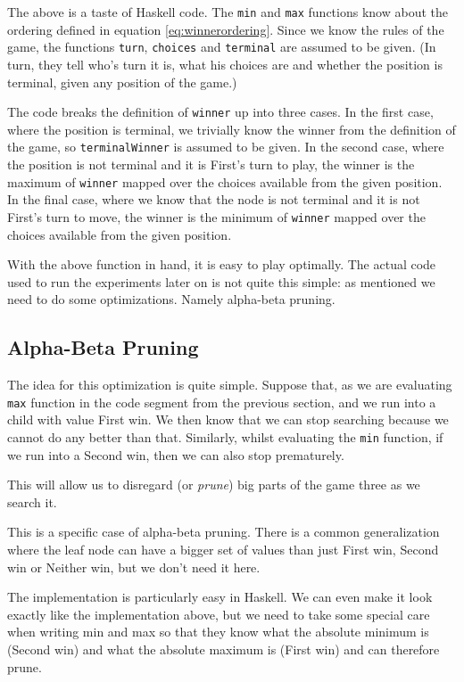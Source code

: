 The above is a taste of Haskell code.
The \texttt{min} and \texttt{max} functions know about the ordering defined in equation \ref{eq:winnerordering}.
Since we know the rules of the game, the functions \texttt{turn}, \texttt{choices} and \texttt{terminal} are assumed to be given.
(In turn, they tell who's turn it is, what his choices are and whether the position is terminal, given any position of the game.)

The code breaks the definition of \texttt{winner} up into three cases.
In the first case, where the position is terminal, we trivially know the winner from the definition of the game, so \texttt{terminalWinner} is assumed to be given.
In the second case, where the position is not terminal and it is First's turn to play, the winner is the maximum of \texttt{winner} mapped over the choices available from the given position.
In the final case, where we know that the node is not terminal and it is not First's turn to move, the winner is the minimum of \texttt{winner} mapped over the choices available from the given position.

With the above function in hand, it is easy to play optimally.
The actual code used to run the experiments later on is not quite this simple: as mentioned we need to do some optimizations.
Namely alpha-beta pruning.

\subsection {Alpha-Beta Pruning}

The idea for this optimization is quite simple.
Suppose that, as we are evaluating \texttt{max} function in the code segment from the previous section, and we run into a child with value First win.
We then know that we can stop searching because we cannot do any better than that.
Similarly, whilst evaluating the \texttt{min} function, if we run into a Second win, then we can also stop prematurely.

This will allow us to disregard (or \emph{prune}) big parts of the game three as we search it.


This is a specific case of alpha-beta pruning.
There is a common generalization where the leaf node can have a bigger set of values than just First win, Second win or Neither win, but we don't need it here.

The implementation is particularly easy in Haskell. We can even make it look exactly like the implementation above, but we need to take some special care when writing min and max so that they know what the absolute minimum is (Second win) and what the absolute maximum is (First win) and can therefore prune.

